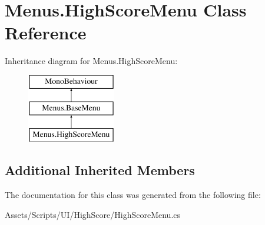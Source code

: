\hypertarget{class_menus_1_1_high_score_menu}{}\section{Menus.\+High\+Score\+Menu Class Reference}
\label{class_menus_1_1_high_score_menu}
Inheritance diagram for Menus.\+High\+Score\+Menu\+:\begin{figure}[H]
\begin{center}
\leavevmode
\includegraphics[height=3.000000cm]{class_menus_1_1_high_score_menu}
\end{center}
\end{figure}
\subsection*{Additional Inherited Members}


The documentation for this class was generated from the following file\+:\begin{DoxyCompactItemize}
\item 
Assets/\+Scripts/\+U\+I/\+High\+Score/High\+Score\+Menu.\+cs\end{DoxyCompactItemize}
